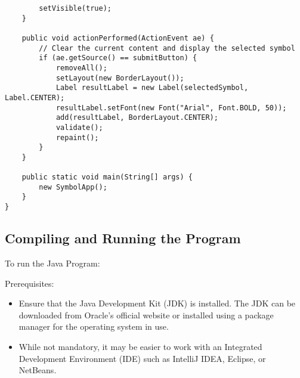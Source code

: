 \begin{verbatim}
        setVisible(true);
    }

    public void actionPerformed(ActionEvent ae) {
        // Clear the current content and display the selected symbol
        if (ae.getSource() == submitButton) {
            removeAll();
            setLayout(new BorderLayout());
            Label resultLabel = new Label(selectedSymbol, Label.CENTER);
            resultLabel.setFont(new Font("Arial", Font.BOLD, 50));
            add(resultLabel, BorderLayout.CENTER);
            validate();
            repaint();
        }
    }

    public static void main(String[] args) {
        new SymbolApp();
    }
}
\end{verbatim}

\subsection{Compiling and Running the Program}
To run the Java Program:

Prerequisites:
\begin{itemize}
    \item Ensure that the Java Development Kit (JDK) is installed. The JDK can be downloaded from Oracle's official website or installed using a package manager for the operating system in use.
    \item While not mandatory, it may be easier to work with an Integrated Development Environment (IDE) such as IntelliJ IDEA, Eclipse, or NetBeans.
\end{itemize}

